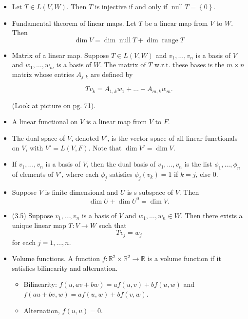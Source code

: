\documentclass[12pt]{article}
\newcommand{\RR}{\mathbb{R}}
\DeclareMathOperator{\Null}{null}
\DeclareMathOperator{\range}{range}
\begin{document}
\begin{itemize}
  \item Let $T \in L(V, W)$.  Then $T$ is injective if and only if $\Null T = \left\{ 0 \right\}$.
  \item Fundamental theorem of linear maps.  Let $T$ be a linear map from $V$ to $W$.  Then
    \[
      \dim V = \dim \Null T + \dim \range T
      \]
    \item Matrix of a linear map.  Suppose $T \in L(V, W)$ and $v_1, \dots, v_n$ is a basis of $V$ and $w_1, \dots, w_m$ is a basis of $W$.  The matrix of $T$ w.r.t. these bases is the $m \times n$ matrix whose entries $A_{j, k}$ are defined by

      \[
        Tv_k = A_{1, k} w_1 + \dots + A_{m, k} w_m.
      \]

      (Look at picture on pg. 71).

    \item A linear functional on $V$ is a linear map from $V$ to $F$.

    \item The dual space of $V$, denoted $V'$, is the vector space of all linear functionals on $V$, with $V' = L(V, F)$.  Note that $\dim V' = \dim V$.

    \item If $v_1, \dots, v_n$ is a basis of $V$, then the dual basis of $v_1, \dots, v_n$ is the list $\phi_1, \dots, \phi_n$ of elements of $V'$, where each $\phi_j$ satisfies $\phi_j(v_k) = 1$ if $k = j$, else $0$.

    \item Suppose $V$ is finite dimensional and $U$ is s subspace of $V$.  Then
      \[
        \dim U + \dim U^0 = \dim V.
      \]

    \item (3.5) Suppose $v_1, \dots, v_n$ is a basis of $V$ and $w_1, \dots, w_n \in W$.  Then there exists a unique linear map $T: V \to W$ such that
      \[
        Tv_j = w_j
      \]
      for each $j = 1, \dots, n$.

    \item Volume functions.  A function $f: \RR^2 \times \RR^2 \to \RR$ is a volume function if it satisfies bilinearity and alternation.
      \begin{itemize}
        \item Bilinearity: $f(u, av + bw) = a f(u, v) + b f(u, w)$ and $f(au + bv, w) = a f(u, w) + b f(v, w)$.
        \item Alternation, $f(u, u) =0$.
      \end{itemize}


\end{itemize}
\end{document}
